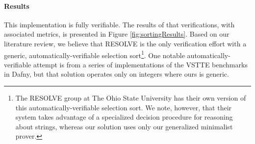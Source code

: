 \paragraph{Results}This implementation is fully verifiable.  The results of that verifications, with associated metrics, is presented in Figure \ref{fig:sortingResults}.  Based on our literature review, we believe that RESOLVE is the only verification effort with a generic, automatically-verifiable selection sort\footnote{The RESOLVE group at The Ohio State University has their own version of this automatically-verifiable selection sort.  We note, however, that their system takes advantage of a specialized decision procedure for reasoning about strings, whereas our solution uses only our generalized minimalist prover.}.  One notable automatically-verifiable attempt is from a series of implementations of the VSTTE benchmarks in Dafny\cite{DafnySolutions}, but that solution operates only on integers where ours is generic.

